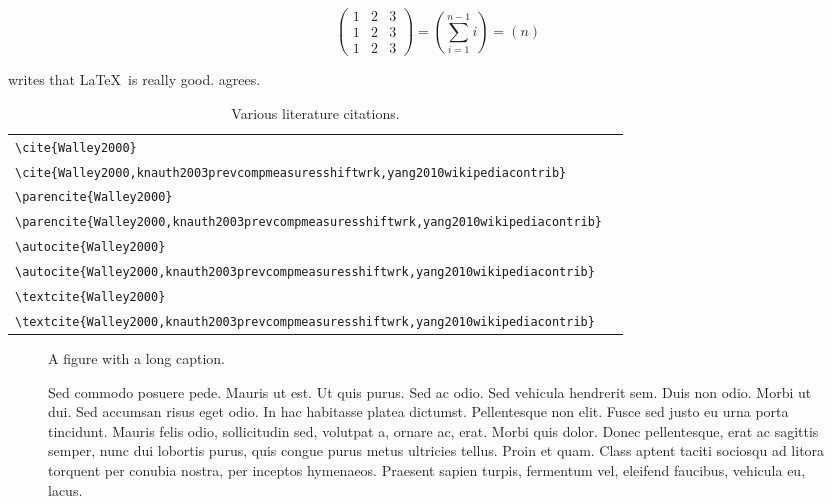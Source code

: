 \documentclass[english]{his-thesis}
\begin{document}
\begin{equation*}
    \begin{pmatrix}
      1 & 2 & 3  \\
      1 & 2 & 3  \\
      1 & 2 & 3
    \end{pmatrix}
    = \left( \sum_{i=1}^{n-1} i \right)
    = \left( n \right)
\end{equation*}

\textcite{Walley2000} writes that \LaTeX\ is really good.
\textcite{entrywithurl} agrees.

\begin{table}
\begin{tabular}{L{.6\linewidth}L{.3\linewidth}}%
\toprule%
\lstinline|\cite{Walley2000}| & \cite{Walley2000} \\[0.5em]%
\lstinline|\cite{Walley2000,knauth2003prevcompmeasuresshiftwrk,yang2010wikipediacontrib}| & \cite{Walley2000,knauth2003prevcompmeasuresshiftwrk,yang2010wikipediacontrib} \\
\midrule%
\lstinline|\parencite{Walley2000}| & \parencite{Walley2000} \\[0.5em]%
\lstinline|\parencite{Walley2000,knauth2003prevcompmeasuresshiftwrk,yang2010wikipediacontrib}| & \parencite{Walley2000,knauth2003prevcompmeasuresshiftwrk,yang2010wikipediacontrib} \\
\midrule%
\lstinline|\autocite{Walley2000}| & \autocite{Walley2000} \\[0.5em]%
\lstinline|\autocite{Walley2000,knauth2003prevcompmeasuresshiftwrk,yang2010wikipediacontrib}| & \autocite{Walley2000,knauth2003prevcompmeasuresshiftwrk,yang2010wikipediacontrib} \\
\midrule%
\lstinline|\textcite{Walley2000}| & \textcite{Walley2000} \\[0.5em]%
\lstinline|\textcite{Walley2000,knauth2003prevcompmeasuresshiftwrk,yang2010wikipediacontrib}| & \textcite{Walley2000,knauth2003prevcompmeasuresshiftwrk,yang2010wikipediacontrib} \\
\bottomrule%
\end{tabular}%
\caption{Various literature citations.}
\end{table}

\begin{figure}
\centering
A figure with a long caption.
\par
\caption{Sed commodo posuere pede. Mauris ut est. Ut quis purus. Sed ac odio.
Sed vehicula hendrerit sem. Duis non odio. Morbi ut dui. Sed accumsan risus eget odio.
In hac habitasse platea dictumst. Pellentesque non elit. Fusce sed justo eu urna porta tincidunt.
Mauris felis odio, sollicitudin sed, volutpat a, ornare ac, erat.
Morbi quis dolor.
Donec pellentesque, erat ac sagittis semper, nunc dui lobortis purus, quis congue purus metus ultricies tellus.
Proin et quam.
Class aptent taciti sociosqu ad litora torquent per conubia nostra, per inceptos hymenaeos.
Praesent sapien turpis, fermentum vel, eleifend faucibus, vehicula eu, lacus.%
}
\end{figure}
\end{document}
